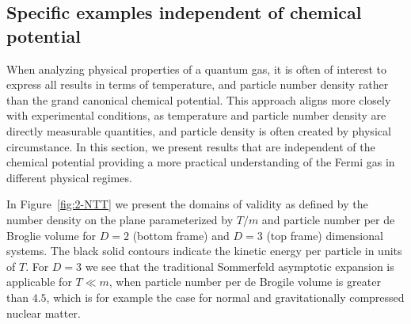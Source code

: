 \documentclass[sn-mathphys,Numbered]{sn-jnl}
\newcommand{\rf}[1]{Figure~{\ref{#1}}}
\newcommand*{\xred}{\color{black}}
\begin{document}
\subsection{\xred Specific examples independent of chemical potential}\label{ssec:NoChem}
{\xred
When analyzing physical properties of a quantum gas, it is often of interest to express all results in terms of temperature, and particle number density rather than the grand canonical chemical potential. This approach aligns more closely with experimental conditions, as temperature and particle number density are directly measurable quantities, and particle density is often created by physical circumstance. In this section, we present results that are independent of the chemical potential providing a more practical understanding of the Fermi gas in different physical regimes.

In \rf{fig:2-NTT} we present the domains of validity as defined by the number density on the plane parameterized by $T/m$ and particle number per de Broglie volume for $D=2$ (bottom frame) and $D=3$ (top frame) dimensional systems. The black solid contours indicate the kinetic energy per particle in units of $T$. For $D=3$ we see that the traditional Sommerfeld asymptotic expansion is applicable for $T\ll m$, when particle number per de Brogile volume is greater than $4.5$, which is for example the case for normal and gravitationally compressed nuclear matter. 

}
\end{document}
